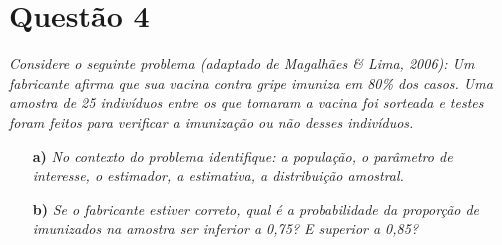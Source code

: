 \documentclass[12pt, a4paper]{article}
\begin{document}
\section*{Questão 4}
\textit{Considere o seguinte problema (adaptado de Magalhães \& Lima, 2006): Um fabricante afirma que sua vacina contra gripe imuniza em 80\% dos casos. Uma amostra de 25 indivíduos entre os que tomaram a vacina foi sorteada e testes foram feitos para verificar a imunização ou não desses indivíduos.}
\begin{itemize}
    \item[\textbf{a)}] \textit{No contexto do problema identifique: a população, o parâmetro de interesse, o estimador, a estimativa, a distribuição amostral.}
    \item[\textbf{b)}] \textit{Se o fabricante estiver correto, qual é a probabilidade da proporção de imunizados na amostra ser inferior a 0,75? E superior a 0,85?}
\end{itemize}
\end{document}
